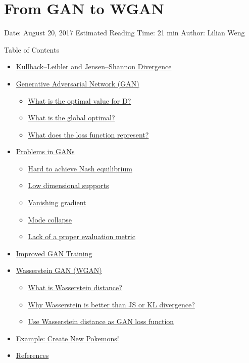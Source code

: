 \section{From GAN to WGAN}\label{from-gan-to-wgan}

Date: August 20, 2017 \textbar{} Estimated Reading Time: 21 min \textbar{} Author: Lilian Weng

{Table of Contents}

\begin{itemize}
\tightlist
\item
  \hyperref[kullbackleibler-and-jensenshannon-divergence]{Kullback--Leibler and Jensen--Shannon Divergence}
\item
  \hyperref[generative-adversarial-network-gan]{Generative Adversarial Network (GAN)}

  \begin{itemize}
  \tightlist
  \item
    \hyperref[what-is-the-optimal-value-for-d]{What is the optimal value for D?}
  \item
    \hyperref[what-is-the-global-optimal]{What is the global optimal?}
  \item
    \hyperref[what-does-the-loss-function-represent]{What does the loss function represent?}
  \end{itemize}
\item
  \hyperref[problems-in-gans]{Problems in GANs}

  \begin{itemize}
  \tightlist
  \item
    \hyperref[hard-to-achieve-nash-equilibrium]{Hard to achieve Nash equilibrium}
  \item
    \hyperref[low-dimensional-supports]{Low dimensional supports}
  \item
    \hyperref[vanishing-gradient]{Vanishing gradient}
  \item
    \hyperref[mode-collapse]{Mode collapse}
  \item
    \hyperref[lack-of-a-proper-evaluation-metric]{Lack of a proper evaluation metric}
  \end{itemize}
\item
  \hyperref[improved-gan-training]{Improved GAN Training}
\item
  \hyperref[wasserstein-gan-wgan]{Wasserstein GAN (WGAN)}

  \begin{itemize}
  \tightlist
  \item
    \hyperref[what-is-wasserstein-distance]{What is Wasserstein distance?}
  \item
    \hyperref[why-wasserstein-is-better-than-js-or-kl-divergence]{Why Wasserstein is better than JS or KL divergence?}
  \item
    \hyperref[use-wasserstein-distance-as-gan-loss-function]{Use Wasserstein distance as GAN loss function}
  \end{itemize}
\item
  \hyperref[example-create-new-pokemons]{Example: Create New Pokemons!}
\item
  \hyperref[references]{References}
\end{itemize}

